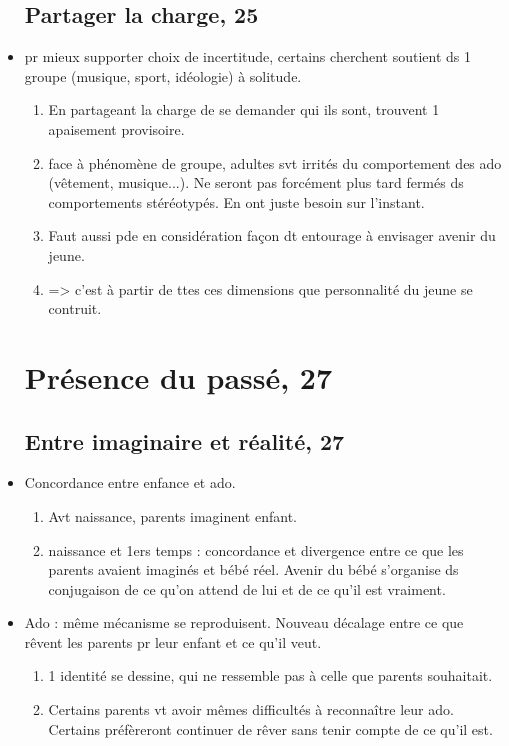 \documentclass[12pt]{report}
\begin{document}
\begin{itemize}
\subsection{Partager la charge, 25}
\item pr mieux supporter choix de incertitude, certains cherchent soutient ds 1 groupe (musique, sport, idéologie) à solitude.\\
\begin{enumerate}
\item En partageant la charge de se demander qui ils sont, trouvent 1 apaisement provisoire.\\
\item face à phénomène de groupe, adultes svt irrités du comportement des ado (vêtement, musique...). Ne seront pas forcément plus tard fermés ds comportements stéréotypés. En ont juste besoin sur l'instant.\\
\item Faut aussi pde en considération façon dt entourage à envisager avenir du jeune.\\
\item => c'est à partir de ttes ces dimensions que personnalité du jeune se contruit. \\
\end{enumerate}


\section{Présence du passé, 27}
\subsection{Entre imaginaire et réalité, 27}

\item Concordance entre enfance et ado.
\begin{enumerate}
\item Avt naissance, parents imaginent enfant.\\
\item naissance et 1ers temps : concordance et divergence entre ce que les parents avaient imaginés et bébé réel. Avenir du bébé s'organise ds conjugaison de ce qu'on attend de lui et de ce qu'il est vraiment. \\
\end{enumerate}

\item Ado :  même mécanisme se reproduisent. Nouveau décalage entre ce que rêvent les parents pr leur enfant et ce qu'il veut.
\begin{enumerate}
\item 1 identité se dessine, qui ne ressemble pas à celle que parents souhaitait.\\
\item Certains parents vt avoir mêmes difficultés à reconnaître leur ado. Certains préfèreront continuer de rêver sans tenir compte de ce qu'il est. \\
\end{enumerate}


\end{itemize}
\end{document}
